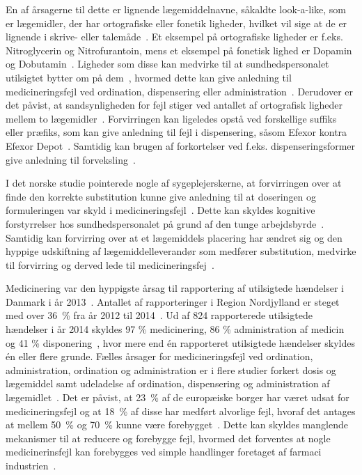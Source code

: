 En af årsagerne til dette er lignende lægemiddelnavne, såkaldte look-a-like, som er lægemidler, der har ortografiske eller fonetik ligheder, hvilket vil sige at de er lignende i skrive- eller talemåde~\citep{Garcia2017,Basco2016}. Et eksempel på ortografiske ligheder er f.eks. Nitroglycerin og Nitrofurantoin, mens et eksempel på fonetisk lighed er Dopamin og Dobutamin~\citep{Basco2016}. Ligheder som disse kan medvirke til at sundhedspersonalet utilsigtet bytter om på dem~\citep{Lopes2012}, hvormed dette kan give anledning til medicineringsfejl ved ordination, dispensering eller administration~\citep{Garcia2017,Lopes2012}. Derudover er det påvist, at sandsynligheden for fejl stiger ved antallet af ortografisk ligheder mellem to lægemidler~\citep{Basco2010}. 
Forvirringen kan ligeledes opstå ved forskellige suffiks eller præfiks, som kan give anledning til fejl i dispensering, såsom Efexor kontra Efexor Depot~\citep{DanskSelskabforPatientsikkerhed2009}. Samtidig kan brugen af forkortelser ved f.eks. dispenseringsformer give anledning til forveksling~\citep{Wittich2014}.

I det norske studie pointerede nogle af sygeplejerskerne, at forvirringen over at finde den korrekte substitution kunne give anledning til at doseringen og formuleringen var skyld i medicineringsfejl~\citep{Hakonsen2010}. Dette kan skyldes kognitive forstyrrelser hos sundhedspersonalet på grund af den tunge arbejdsbyrde~\citep{Wittich2014}. Samtidig kan forvirring over at et lægemiddels placering har ændret sig og den hyppige udskiftning af lægemiddelleverandør som medfører substitution, medvirke til forvirring og derved lede til medicineringsfej~\citep{Wittich2014}.

Medicinering var den hyppigste årsag til rapportering af utilsigtede hændelser i Danmark i år 2013~\citep{Patientombuddet2013}. Antallet af rapporteringer i Region Nordjylland er steget med over 36~\% fra år 2012 til 2014~\citep{Jensen2014}. Ud af 824 rapporterede utilsigtede hændelser i år 2014 skyldes 97 \% medicinering, 86 \% administration af medicin og 41 \% disponering~\citep{Jensen2014}, hvor mere end én rapporteret utilsigtede hændelser skyldes én eller flere grunde. Fælles årsager for medicineringsfejl ved ordination, administration, ordination og administration er i flere studier  forkert dosis og lægemiddel samt udeladelse af ordination, dispensering og administration af lægemidlet~\citep{Barker2002,Sundhedsstyrelsen2005,Lisby2005, Tully2009}.
Det er påvist, at 23~\% af de europæiske borger har været udsat for medicineringsfejl og at 18~\% af disse har medført alvorlige fejl, hvoraf det antages at mellem 50~\% og 70~\% kunne være forebygget~\citep{Garcia2017}. Dette kan skyldes manglende mekanismer til at reducere og forebygge fejl, hvormed det forventes at nogle medicinerinsfejl kan forebygges ved simple handlinger foretaget af farmaci industrien~\citep{Lopes2012}.


